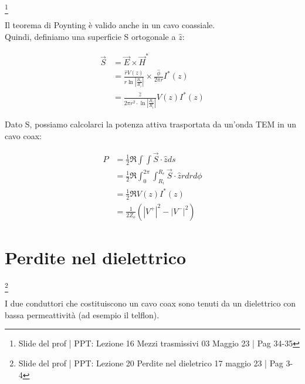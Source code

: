 \footnote{Slide del prof | PPT: Lezione 16 Mezzi trasmissivi 03 Maggio 23 | Pag 34-35}

Il teorema di Poynting è valido anche in un cavo coassiale. \\ 
Quindi, definiamo una superficie S ortogonale a $\hat{z}$: 

{\Large \begin{equation}
    \begin{split}
        \vec{S} 
        &= \vec{E} \times \vec{H}^{*} \\ 
        &= \frac{\hat{r} V(z)}{r \ln \left|\frac{R_e}{R_i}\right|}  \times \frac{\hat{\phi}}{2 \pi r} I^{*} (z) \\ 
        &= \frac{\hat{z}}{2 \pi r^{2} \cdot \ln \left|\frac{R_e}{R_i}\right|} V(z) I^{*} (z) 
    \end{split}
\end{equation}}

Dato S, possiamo calcolarci la potenza attiva trasportata da un'onda TEM in un cavo coax: 

{\Large \begin{equation}
    \begin{split}
        P &= \frac{1}{2} \Re{\int \int \vec{S} \cdot \hat{z} ds} \\ 
        &= \frac{1}{2} \Re{\int_{0}^{2 \pi} \int_{R_i}^{R_e} \vec{S} \cdot \hat{z} r dr d\phi} \\
        &= \frac{1}{2} \Re{V(z) I^{*} (z)} \\ 
        &= \frac{1}{2 Z_o} (\left|V^{+}\right| ^{2} - \left|V^{-}\right| ^{2})
    \end{split}
\end{equation}}

\newpage 

\section{Perdite nel dielettrico} 

\footnote{Slide del prof | PPT: Lezione 20 Perdite nel dieletrico 17 maggio 23 | Pag 3-4}

I due conduttori che costituiscono un cavo coax sono tenuti da un dielettrico con bassa permeattività 
(ad esempio il telflon). \\ 

